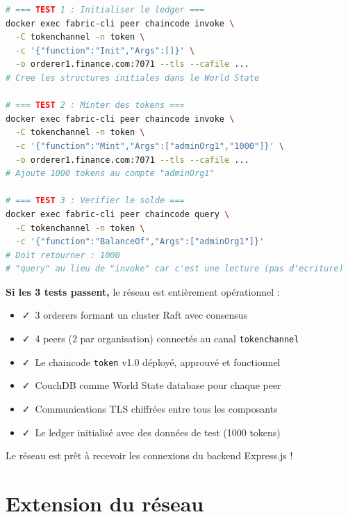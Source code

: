 \documentclass[12pt,a4paper,twoside]{report}
\begin{document}
\begin{lstlisting}[language=bash, caption=Tests fonctionnels du chaincode]
# === TEST 1 : Initialiser le ledger ===
docker exec fabric-cli peer chaincode invoke \
  -C tokenchannel -n token \
  -c '{"function":"Init","Args":[]}' \
  -o orderer1.finance.com:7071 --tls --cafile ...
# Cree les structures initiales dans le World State

# === TEST 2 : Minter des tokens ===
docker exec fabric-cli peer chaincode invoke \
  -C tokenchannel -n token \
  -c '{"function":"Mint","Args":["adminOrg1","1000"]}' \
  -o orderer1.finance.com:7071 --tls --cafile ...
# Ajoute 1000 tokens au compte "adminOrg1"

# === TEST 3 : Verifier le solde ===
docker exec fabric-cli peer chaincode query \
  -C tokenchannel -n token \
  -c '{"function":"BalanceOf","Args":["adminOrg1"]}'
# Doit retourner : 1000
# "query" au lieu de "invoke" car c'est une lecture (pas d'ecriture)
\end{lstlisting}

\begin{successbox}
\textbf{Si les 3 tests passent,} le réseau est entièrement opérationnel :
\begin{itemize}
    \item \faCheck\ 3 orderers formant un cluster Raft avec consensus
    \item \faCheck\ 4 peers (2 par organisation) connectés au canal \texttt{tokenchannel}
    \item \faCheck\ Le chaincode \texttt{token} v1.0 déployé, approuvé et fonctionnel
    \item \faCheck\ CouchDB comme World State database pour chaque peer
    \item \faCheck\ Communications TLS chiffrées entre tous les composants
    \item \faCheck\ Le ledger initialisé avec des données de test (1000 tokens)
\end{itemize}
Le réseau est prêt à recevoir les connexions du backend Express.js !
\end{successbox}


\chapter{Extension du réseau}
\end{document}
